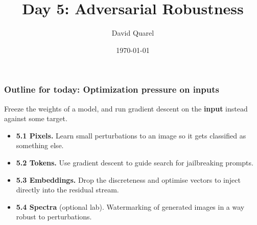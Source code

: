 \DeclareMathOperator{\sign}{sign}
\DeclareMathOperator{\clip}{clip}
\newcommand{\Rl}{\mathbb{R}}
\newcommand{\Loss}{\mathcal{L}}
\newcommand{\eps}{\varepsilon}

\newcommand{\xx}{\mathbf{x}}                    %
\newcommand{\dd}{\boldsymbol{\delta}}           %
\newcommand{\tgt}{\mathrm{tgt}}

\newcommand{\Vocab}{\mathcal{V}}                %
\newcommand{\Emb}{\mathbf{E}}                   %
\newcommand{\Zpre}{\mathbf{Z}}                  %
\newcommand{\ee}{\mathbf{e}}                    %
\newcommand{\cat}{\oplus}                       %

\newcommand{\Fou}{\mathcal{F}}                  %

\newcommand{\figsrc}[1]{\par\vspace{1pt}{\tiny\color{gray}#1}}



\title[AISB Day 5: Adversarial Robustness]
{Day 5: Adversarial Robustness}

\author[David Quarel]
{David Quarel}


\date[\today]
{\today}

\frame{\titlepage}

\begin{frame}
\frametitle{Outline for today: Optimization pressure on inputs}
Freeze the weights of a model, and run gradient
descent on the \textbf{input} instead against some target.
\vspace{0.3cm}
\begin{itemize}
    \item \textbf{5.1 Pixels.} Learn small perturbations to an image so it 
    gets classified as something else.
    \vspace{0.15cm}
    \item \textbf{5.2 Tokens.} Use gradient descent to guide search for jailbreaking prompts.
    \vspace{0.15cm}
    \item \textbf{5.3 Embeddings.} Drop the discreteness and optimise vectors
    to inject directly into the residual stream.
    \vspace{0.15cm}
    \item \textbf{5.4 Spectra} (optional lab). Watermarking of generated images
    in a way robust to perturbations.
\end{itemize}
\end{frame}

